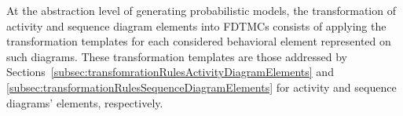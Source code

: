 %	    
%
%    
%	
%
%    
%  

At the abstraction level of generating probabilistic models, the transformation
of activity and sequence diagram elements into FDTMCs consists of applying the 
transformation templates for each considered behavioral element represented on
such diagrams. These transformation templates are those addressed by Sections~\ref{subsec:transfomrationRulesActivityDiagramElements} and \ref{subsec:transformationRulesSequenceDiagramElements} for activity and sequence diagrams' elements, respectively.%

